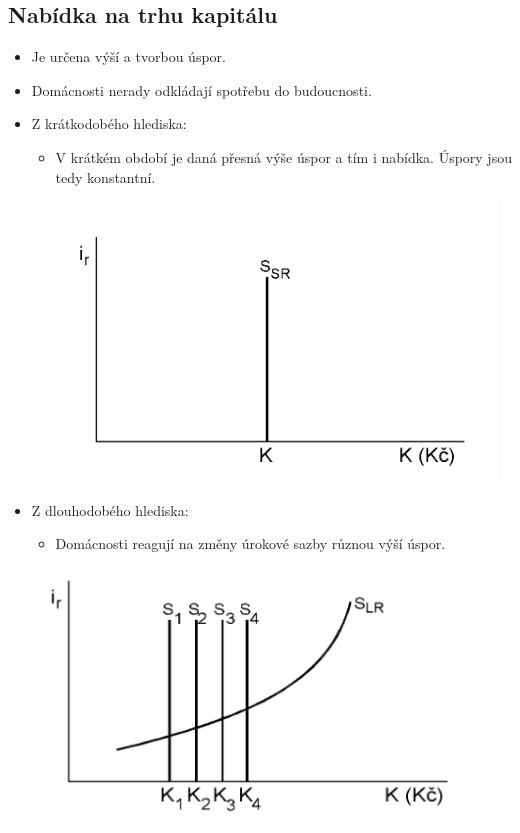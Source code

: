 \subsection{Nabídka na trhu kapitálu}
\begin{itemize}
    \item Je určena výší a tvorbou úspor.
    \item Domácnosti nerady odkládají spotřebu do budoucnosti.
    \item Z krátkodobého hlediska:
    \begin{itemize}
        \item V krátkém období je daná přesná výše úspor a tím  i nabídka. Úspory jsou tedy konstantní.
    \end{itemize}
    \includegraphics[]{images/18_kratkodoba_nabidka.png}
    \item Z dlouhodobého hlediska:
    \begin{itemize}
        \item Domácnosti reagují na změny úrokové sazby různou výší úspor.
    \end{itemize}
    \includegraphics[]{images/18_dlouhodoba_nabidka.png}
\end{itemize}

